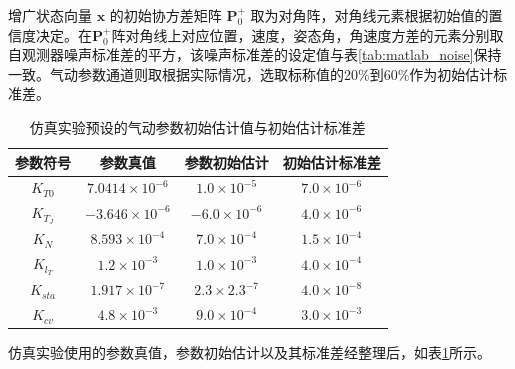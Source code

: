 增广状态向量 $\boldsymbol{x}$ 的初始协方差矩阵 $\boldsymbol{P}_0^+$ 取为对角阵，对角线元素根据初始值的置信度决定。在$\boldsymbol{P}_0^+$阵对角线上对应位置，速度，姿态角，角速度方差的元素分别取自观测器噪声标准差的平方，该噪声标准差的设定值与表\ref{tab:matlab_noise}保持一致。气动参数通道则取根据实际情况，选取标称值的20\%到60\%作为初始估计标准差。

\begin{table}[htbp]
    \centering
    \caption{仿真实验预设的气动参数初始估计值与初始估计标准差}
    \label{tab:true_theta}
    \begin{tabular}{cccc}
    \toprule
    参数符号 & 参数真值 & 参数初始估计 & 初始估计标准差 \\
    \midrule
    $K_{T0}$ & $7.0414 \times 10^{-6}$ & $1.0 \times 10^{-5}$ & $7.0 \times 10^{-6}$ \\
    $K_{T_J}$ & $-3.646 \times 10^{-6}$ & $-6.0 \times 10^{-6}$ & $4.0 \times 10^{-6}$ \\
    $K_{N}$ & $8.593 \times 10^{-4}$ & $7.0 \times 10^{-4}$ & $1.5 \times 10^{-4}$ \\
    $K_{l_T}$ & $1.2 \times 10^{-3}$ & $1.0 \times 10^{-3}$ & $4.0 \times 10^{-4}$ \\
    $K_{sta}$ & $1.917 \times 10^{-7}$ & $2.3 \times 2.3^{-7}$ & $4.0 \times 10^{-8}$ \\
    $K_{cv}$ & $4.8 \times 10^{-3}$ & $9.0 \times 10^{-4}$ & $3.0 \times 10^{-3}$ \\
    \bottomrule
    \end{tabular}
\end{table}

仿真实验使用的参数真值，参数初始估计以及其标准差经整理后，如表\ref{tab:true_theta}所示。

